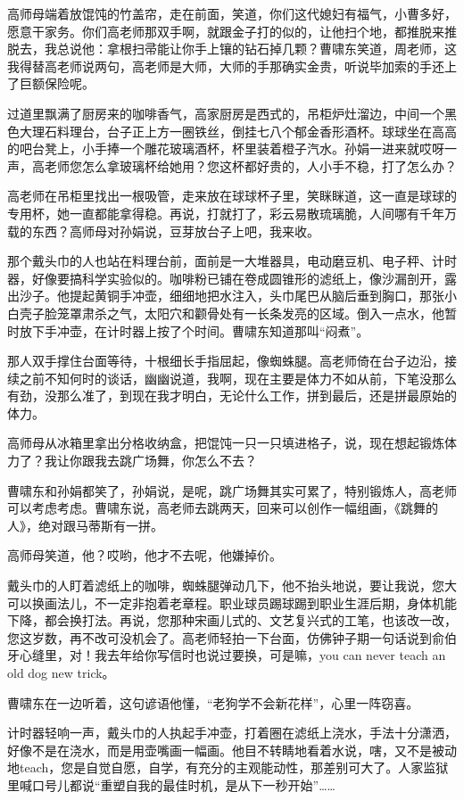 \documentclass[lang=cn,newtx,12pt,scheme=chinese]{elegantbook}
\begin{document}
高师母端着放馄饨的竹盖帘，走在前面，笑道，你们这代媳妇有福气，小曹多好，愿意干家务。你们高老师那双手啊，就跟金子打的似的，让他扫个地，都推脱来推脱去，我总说他：拿根扫帚能让你手上镶的钻石掉几颗？曹啸东笑道，周老师，这我得替高老师说两句，高老师是大师，大师的手那确实金贵，听说毕加索的手还上了巨额保险呢。

过道里飘满了厨房来的咖啡香气，高家厨房是西式的，吊柜炉灶溜边，中间一个黑色大理石料理台，台子正上方一圈铁丝，倒挂七八个郁金香形酒杯。球球坐在高高的吧台凳上，小手捧一个雕花玻璃酒杯，杯里装着橙子汽水。孙娟一进来就哎呀一声，高老师您怎么拿玻璃杯给她用？您这杯都好贵的，人小手不稳，打了怎么办？

高老师在吊柜里找出一根吸管，走来放在球球杯子里，笑眯眯道，这一直是球球的专用杯，她一直都能拿得稳。再说，打就打了，彩云易散琉璃脆，人间哪有千年万载的东西？高师母对孙娟说，豆芽放台子上吧，我来收。

那个戴头巾的人也站在料理台前，面前是一大堆器具，电动磨豆机、电子秤、计时器，好像要搞科学实验似的。咖啡粉已铺在卷成圆锥形的滤纸上，像沙漏剖开，露出沙子。他提起黄铜手冲壶，细细地把水注入，头巾尾巴从脑后垂到胸口，那张小白壳子脸笼罩肃杀之气，太阳穴和颧骨处有一长条发亮的区域。倒入一点水，他暂时放下手冲壶，在计时器上按了个时间。曹啸东知道那叫“闷煮”。

那人双手撑住台面等待，十根细长手指屈起，像蜘蛛腿。高老师倚在台子边沿，接续之前不知何时的谈话，幽幽说道，我啊，现在主要是体力不如从前，下笔没那么有劲，没那么准了，到现在我才明白，无论什么工作，拼到最后，还是拼最原始的体力。

高师母从冰箱里拿出分格收纳盒，把馄饨一只一只填进格子，说，现在想起锻炼体力了？我让你跟我去跳广场舞，你怎么不去？

曹啸东和孙娟都笑了，孙娟说，是呢，跳广场舞其实可累了，特别锻炼人，高老师可以考虑考虑。曹啸东说，高老师去跳两天，回来可以创作一幅组画，《跳舞的人》，绝对跟马蒂斯有一拼。

高师母笑道，他？哎哟，他才不去呢，他嫌掉价。

戴头巾的人盯着滤纸上的咖啡，蜘蛛腿弹动几下，他不抬头地说，要让我说，您大可以换画法儿，不一定非抱着老章程。职业球员踢球踢到职业生涯后期，身体机能下降，都会换打法。再说，您那种宋画儿式的、文艺复兴式的工笔，也该改一改，您这岁数，再不改可没机会了。高老师轻拍一下台面，仿佛钟子期一句话说到俞伯牙心缝里，对！我去年给你写信时也说过要换，可是嘛，you can never teach an old dog new trick。

曹啸东在一边听着，这句谚语他懂，“老狗学不会新花样”，心里一阵窃喜。

计时器轻响一声，戴头巾的人执起手冲壶，打着圈在滤纸上浇水，手法十分潇洒，好像不是在浇水，而是用壶嘴画一幅画。他目不转睛地看着水说，嗐，又不是被动地teach，您是自觉自愿，自学，有充分的主观能动性，那差别可大了。人家监狱里喊口号儿都说“重塑自我的最佳时机，是从下一秒开始”……
\end{document}
